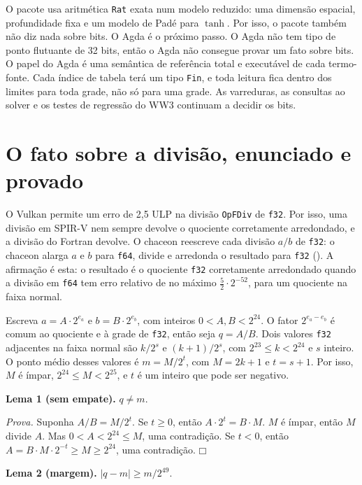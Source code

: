 \documentclass[10pt,a4paper,]{article}
\begin{document}
O pacote usa aritmética \texttt{Rat} exata num modelo reduzido: uma
dimensão espacial, profundidade fixa e um modelo de Padé para \(\tanh\).
Por isso, o pacote também não diz nada sobre bits. O Agda é o próximo
passo. O Agda não tem tipo de ponto flutuante de 32 bits, então o Agda
não consegue provar um fato sobre bits. O papel do Agda é uma semântica
de referência total e executável de cada termo-fonte. Cada índice de
tabela terá um tipo \texttt{Fin}, e toda leitura fica dentro dos limites
para toda grade, não só para uma grade. As varreduras, as consultas ao
solver e os testes de regressão do WW3 continuam a decidir os bits.

\section{O fato sobre a divisão, enunciado e
provado}\label{sec:division}

O Vulkan permite um erro de 2,5 ULP na divisão \texttt{OpFDiv} de
\texttt{f32}. Por isso, uma divisão em SPIR-V nem sempre devolve o
quociente corretamente arredondado, e a divisão do Fortran devolve. O
chaceon reescreve cada divisão \(a/b\) de \texttt{f32}: o chaceon alarga
\(a\) e \(b\) para \texttt{f64}, divide e arredonda o resultado para
\texttt{f32} (). A afirmação é
esta: o resultado é o quociente \texttt{f32} corretamente arredondado
quando a divisão em \texttt{f64} tem erro relativo de no máximo
\(\tfrac{5}{2}\cdot 2^{-52}\), para um quociente na faixa normal.

Escreva \(a = A\cdot 2^{e_a}\) e \(b = B\cdot 2^{e_b}\), com inteiros
\(0 < A, B < 2^{24}\). O fator \(2^{e_a-e_b}\) é comum ao quociente e à
grade de \texttt{f32}, então seja \(q = A/B\). Dois valores \texttt{f32}
adjacentes na faixa normal são \(k/2^{s}\) e \((k+1)/2^{s}\), com
\(2^{23} \le k < 2^{24}\) e \(s\) inteiro. O ponto médio desses valores
é \(m = M/2^{t}\), com \(M = 2k+1\) e \(t = s+1\). Por isso, \(M\) é
ímpar, \(2^{24} \le M < 2^{25}\), e \(t\) é um inteiro que pode ser
negativo.

\textbf{Lema 1 (sem empate).} \(q \ne m\).

\emph{Prova.} Suponha \(A/B = M/2^{t}\). Se \(t \ge 0\), então
\(A\cdot 2^{t} = B\cdot M\). \(M\) é ímpar, então \(M\) divide \(A\).
Mas \(0 < A < 2^{24} \le M\), uma contradição. Se \(t < 0\), então
\(A = B\cdot M\cdot 2^{-t} \ge M \ge 2^{24}\), uma contradição.
\(\mdlgwhtsquare\)

\textbf{Lema 2 (margem).} \(|q - m| \ge m/2^{49}\).
\end{document}
